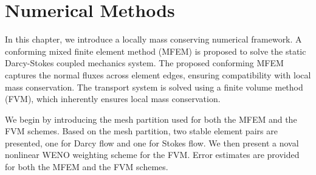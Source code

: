 
\DeclarePairedDelimiter\ceil{\lceil}{\rceil}
\DeclarePairedDelimiter\floor{\lfloor}{\rfloor}
\newcommand{\Mod}[1]{\ (\mathrm{mod}\ #1)}

\chapter[Numerical Methods]{Numerical Methods}
\label{chap:numerics}
In this chapter, we introduce a locally mass conserving numerical framework.
A conforming mixed finite element method (MFEM) is proposed to solve
the static Darcy-Stokes coupled mechanics system.
The proposed conforming MFEM captures the normal fluxes across element edges, 
ensuring compatibility with local mass conservation.
The transport system is solved using a finite volume method (FVM), 
which inherently ensures local mass conservation.

We begin by introducing the mesh partition used for both the MFEM and the
FVM schemes. Based on the mesh partition,  
two stable element pairs are presented, one for Darcy flow and one for 
Stokes flow. %
We then present a noval nonlinear WENO weighting scheme for the FVM.
Error estimates are provided for both the MFEM and the FVM schemes.






%

